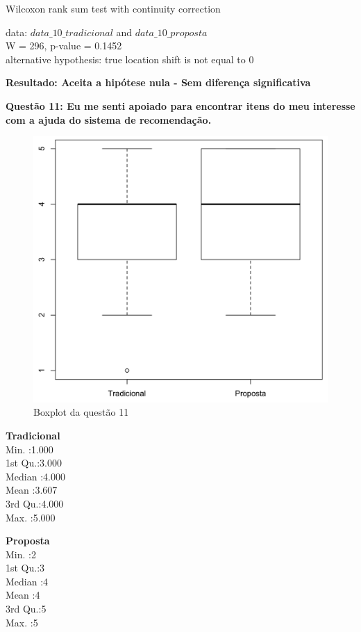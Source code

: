 Wilcoxon rank sum test with continuity correction

\noindent
data:  $data\_10\_tradicional$ and $data\_10\_proposta$\\
W = 296, p-value = 0.1452\\
alternative hypothesis: true location shift is not equal to 0

\textbf{Resultado: Aceita a hipótese nula - Sem diferença significativa}

\newpage
\textbf{Questão 11: Eu me senti apoiado para encontrar itens do meu interesse com a ajuda do sistema de recomendação.}

\begin{figure}[htb]
  \caption{\label{fig:questao11-boxplot}Boxplot da questão 11}
  \begin{center}
      \includegraphics[scale=0.4]{./Figuras/questao11-boxplot.png}
  \end{center}
\end{figure}

\begin{multicols}{2}

\noindent\textbf{Tradicional}\\
Min.   :1.000\\
1st Qu.:3.000\\
Median :4.000\\
Mean   :3.607\\
3rd Qu.:4.000\\
Max.   :5.000\\
\columnbreak

\noindent\textbf{Proposta}\\
Min.   :2\\
1st Qu.:3\\
Median :4\\
Mean   :4\\
3rd Qu.:5\\
Max.   :5
\end{multicols}


